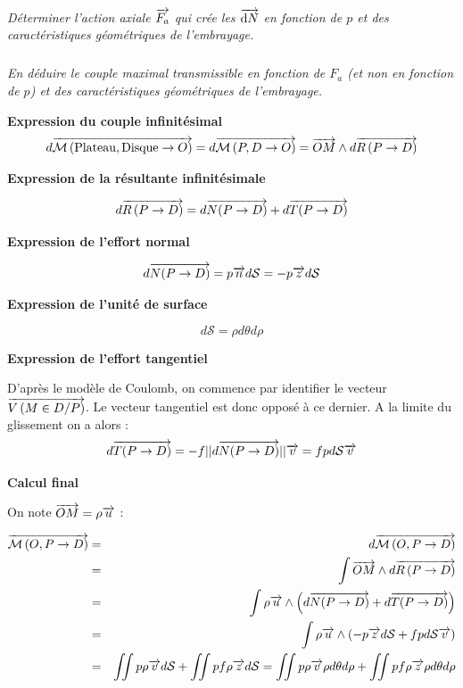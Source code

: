 \documentclass[10pt,fleqn]{article} %
\begin{document}
\begin{multicols}{2}
\subparagraph{}
\textit{Déterminer l’action axiale $\overrightarrow{F_a}$ qui crée les $\overrightarrow{\text{d}N}$ en fonction de $p$ et des caractéristiques géométriques de l’embrayage.}

\subparagraph{}
\textit{En déduire le couple maximal transmissible en fonction de $F_a$ (et non en fonction de $p$) et des caractéristiques géométriques de l’embrayage.}

\ifprof
\newpage
\begin{corrige}

\textbf{Expression du couple infinitésimal}
$$
d\overrightarrow{\mathcal{M}\left( {\text{Plateau}}, {\text{Disque}} \rightarrow {O}\right)} =
d\overrightarrow{\mathcal{M}\left( {P}, {D} \rightarrow {O}\right)} =  \overrightarrow{OM}\wedge d\overrightarrow{R\left( {P} \rightarrow {D}\right)}
$$

\textbf{Expression de la résultante infinitésimale}

$$
d\overrightarrow{R\left( {P} \rightarrow {D}\right)} = d\overrightarrow{N(P\rightarrow D)}+d\overrightarrow{T(P\rightarrow D)}
$$

\textbf{Expression de l'effort normal}

$$
d\overrightarrow{N(P\rightarrow D)} = p \overrightarrow{n} d\mathcal{S} = -p \overrightarrow{z} d\mathcal{S}
$$

\textbf{Expression de l'unité de surface}

$$
d\mathcal{S} = \rho d\theta d\rho
$$

\textbf{Expression de l'effort tangentiel}

D'après le modèle de Coulomb, on commence par identifier le vecteur $\overrightarrow{V\left( {M} \in {D}/{P}\right)}$.
Le vecteur tangentiel est donc opposé à ce dernier. A la limite du glissement on a alors : 
$$
d\overrightarrow{T(P\rightarrow D)} = -f ||d\overrightarrow{N(P\rightarrow D)}|| \overrightarrow{v}    = fp d\mathcal{S}\overrightarrow{v}
$$

\textbf{Calcul final}

On note $\overrightarrow{OM}=\rho\overrightarrow{u}$ :

\begin{eqnarray*}
\overrightarrow{\mathcal{M}\left( {O}, {P} \rightarrow {D}\right)}  
&=& d\overrightarrow{\mathcal{M}\left( {O}, {P} \rightarrow {D}\right)}  \\
&=& \int \overrightarrow{OM}\wedge d\overrightarrow{R\left( {P} \rightarrow {D}\right)} \\
&=& \int \rho\overrightarrow{u} \wedge \left( d\overrightarrow{N(P\rightarrow D)}+d\overrightarrow{T(P\rightarrow D)} \right)\\
&=& \int \rho\overrightarrow{u} \wedge \left( -p \overrightarrow{z} d\mathcal{S} +fp d\mathcal{S}\overrightarrow{v} \right)\\
&=& \iint p\rho\overrightarrow{v} d\mathcal{S} +\iint pf\rho  \overrightarrow{z}d\mathcal{S} = 
\iint p\rho\overrightarrow{v} \rho d\theta d\rho +\iint pf\rho  \overrightarrow{z}\rho d\theta d\rho \\
\end{eqnarray*}


\end{corrige}
\end{multicols}
\end{document}
